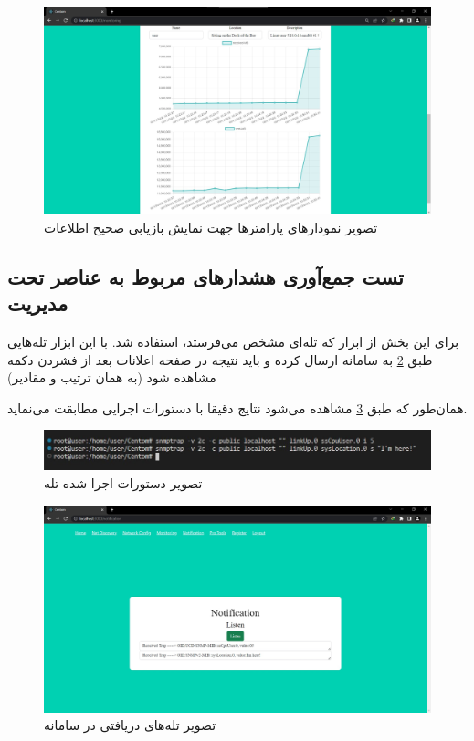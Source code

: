 \begin{figure}[!h]
    \centering\includegraphics[scale=.38]{./monitoring-after}
    \caption{تصویر نمودارهای پارامترها جهت نمایش بازیابی صحیح اطلاعات}\label{fig.54}
\end{figure}



\cleardoublepage


\subsection{تست جمع‌آوری هشدارهای مربوط به عناصر تحت مدیریت}

برای این بخش از ابزار  که تله‌ای مشخص می‌فرستد، استفاده شد. با این ابزار تله‌هایی طبق \cref{fig.55} به سامانه ارسال کرده و باید نتیجه در صفحه اعلانات بعد از فشردن دکمه مشاهده شود (به همان ترتیب و مقادیر)


همان‌طور که طبق \cref{fig.56} مشاهده می‌شود نتایج دقیقا با دستورات اجرایی مطابقت می‌نماید.


\begin{figure}[!h]
    \centering\includegraphics[scale=.70]{./trap-before}
    \caption{تصویر دستورات اجرا شده تله}\label{fig.55}
\end{figure}

\begin{figure}[!h]
    \centering\includegraphics[scale=.38]{./notification}
    \caption{تصویر تله‌های دریافتی در سامانه}\label{fig.56}
\end{figure}

